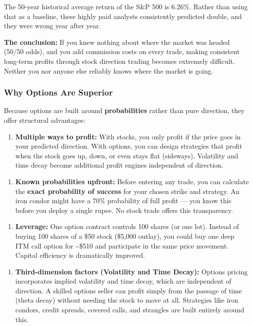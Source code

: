 \documentclass[12pt,openany]{book}
\begin{document}
The 50-year historical average return of the S\&P 500 is 6.26\%. Rather than using that as a baseline, these highly paid analysts consistently predicted double, and they were wrong year after year.

\textbf{The conclusion:} If you knew nothing about where the market was headed (50/50 odds), and you add commission costs on every trade, making consistent long-term profits through stock direction trading becomes extremely difficult. Neither you nor anyone else reliably knows where the market is going.

\subsubsection{Why Options Are Superior}

Because options are built around \textbf{probabilities} rather than pure direction, they offer structural advantages:

\begin{enumerate}[leftmargin=*]
    \item \textbf{Multiple ways to profit:} With stocks, you only profit if the price goes in your predicted direction. With options, you can design strategies that profit when the stock goes up, down, or even stays flat (sideways). Volatility and time decay become additional profit engines independent of direction.
\end{enumerate}

\begin{enumerate}[leftmargin=*]
    \item \textbf{Known probabilities upfront:} Before entering any trade, you can calculate the \textbf{exact probability of success} for your chosen strike and strategy. An iron condor might have a 70\% probability of full profit — you know this before you deploy a single rupee. No stock trade offers this transparency.
\end{enumerate}

\begin{enumerate}[leftmargin=*]
    \item \textbf{Leverage:} One option contract controls 100 shares (or one lot). Instead of buying 100 shares of a \$50 stock (\$5,000 outlay), you could buy one deep ITM call option for \textasciitilde{}\$510 and participate in the same price movement. Capital efficiency is dramatically improved.
\end{enumerate}

\begin{enumerate}[leftmargin=*]
    \item \textbf{Third-dimension factors (Volatility and Time Decay):} Options pricing incorporates implied volatility and time decay, which are independent of direction. A skilled options seller can profit simply from the passage of time (theta decay) without needing the stock to move at all. Strategies like iron condors, credit spreads, covered calls, and strangles are built entirely around this.
\end{enumerate}
\end{document}
